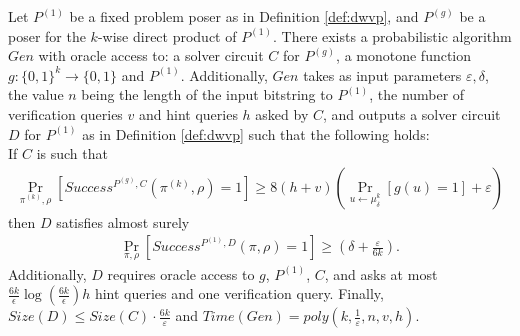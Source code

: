\begin{theorem}
\label{th:sec_amp_for_dwvp}
Let $P^{(1)}$ be a fixed problem poser as in Definition \ref{def:dwvp}, and $P^{(g)}$ be a poser for the $k$-wise direct product of $P^{(1)}$.
There exists a probabilistic algorithm $Gen$ with oracle access to: a solver circuit $C$ for $P^{(g)}$,
a monotone function $g:\{0,1\}^k \rightarrow \{0,1\}$ and $P^{(1)}$. Additionally, $Gen$ takes as input parameters $\varepsilon, \delta$,
the value $n$ being the length of the input bitstring to $P^{(1)}$,
the number of verification queries $v$ and hint queries $h$ asked by $C$, and outputs a solver circuit $D$ for $P^{(1)}$ as in Definition \ref{def:dwvp}
such that the following holds: \\
If $C$ is such that \\
  \begin{align*}
    \underset{\pi^{(k)}, \rho}{\Pr}\left[Success^{P^{(g)}, C}(\pi^{(k)}, \rho) = 1\right] \geq 8(h+v)\left(\underset{u \leftarrow \mu_\delta^k}{\Pr}\left[g(u) = 1\right] + \varepsilon\right)
  \end{align*}
then $D$ satisfies almost surely
  \begin{align*}
    \underset{\pi, \rho}{\Pr}\left[Success^{P^{(1)},D}(\pi, \rho) = 1\right] \geq (\delta + \frac{\varepsilon}{6k}).
  \end{align*}
Additionally, $D$ requires oracle access to $g$, $P^{(1)}$, $C$,
and asks at most $\frac{6k}{\epsilon}\log\left(\frac{6k}{\epsilon}\right) h$ hint queries and one verification query.
Finally, $Size(D) \leq Size(C) \cdot \frac{6k}{\varepsilon}$ and $Time(Gen) = poly(k, \frac{1}{\varepsilon}, n, v, h)$.
\end{theorem}
%


